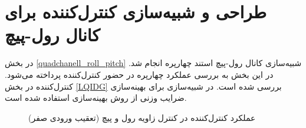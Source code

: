 \section{طراحی و شبیه‌سازی کنترل‌کننده برای کانال رول-پیچ}
\label{roll_pitch_lqidg_section_simulation}
در بخش
\ref{quadchanell_roll_pitch}
شبیه‌سازی کانال رول-پیچ استند چهارپره انجام شد. در این بخش به بررسی عملکرد چهارپره در حضور کنترل‌کننده  پرداخته می‌شود. کنترل‌کننده   در بخش
\ref{LQIDG}
بررسی شده است.
 در شبیه‌سازی برای بهینه‌سازی ضرایب وزنی   از روش بهینه‌سازی
 \cite{Karimi2010}
استفاده شده است.
%	
\begin{figure}[H]
	\centering
	\caption{‫‪عملکرد کنترل‌کننده  در کنترل زاویه رول و پیچ (تعقیب ورودی صفر)}
	\label{lqidg_roll_pitch_fig_simulation}
\end{figure}



